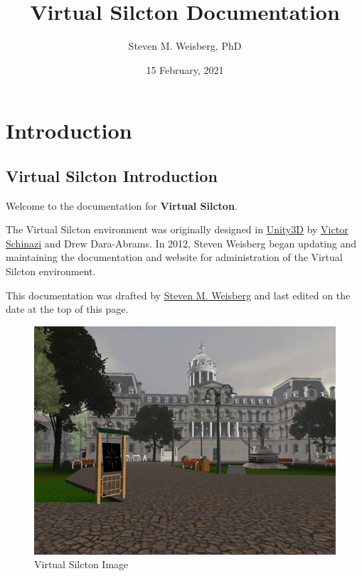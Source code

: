 \documentclass[
  12pt,
]{book}
\title{Virtual Silcton Documentation}
\author{Steven M. Weisberg, PhD}
\date{15 February, 2021}
\begin{document}
\maketitle

{
\hypersetup{linkcolor=}
\setcounter{tocdepth}{1}
\tableofcontents
}
\hypertarget{part-introduction}{%
\part*{Introduction}\label{part-introduction}}

\hypertarget{virtual-silcton-introduction}{%
\chapter{Virtual Silcton Introduction}\label{virtual-silcton-introduction}}

Welcome to the documentation for \textbf{Virtual Silcton}.

The Virtual Silcton environment was originally designed in \href{https://unity.com/}{Unity3D} by \href{vschinaz@bond.edu.au}{Victor Schinazi} and Drew Dara-Abrams. In 2012, Steven Weisberg began updating and maintaining the documentation and website for administration of the Virtual Silcton environment.

This documentation was drafted by \href{scannlab.psych.ufl.edu}{Steven M. Weisberg} and last edited on the date at the top of this page.

\begin{figure}
\centering
\includegraphics{./figs/Cover_Page.jpg}
\caption{Virtual Silcton Image}
\end{figure}
\end{document}
